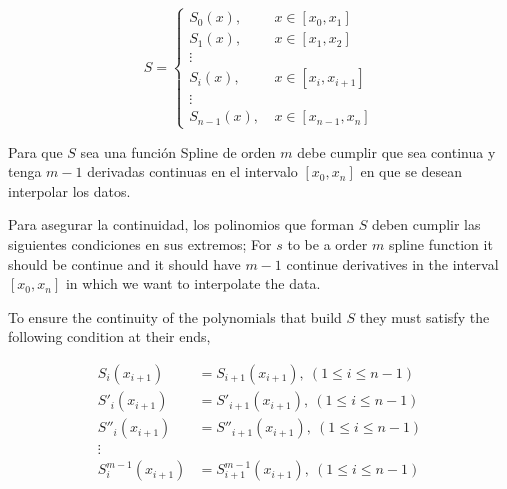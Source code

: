 \begin{equation*}
S= \left\{ 
\begin{aligned}
S_0(x),& \ x\in [x_0,x_1]\\
S_1(x),& \ x\in [x_1,x_2]\\
\vdots \\
S_i(x),& \ x\in [x_i,x_{i+1}]\\
\vdots \\
S_{n-1}(x),& \ x\in [x_{n-1},x_n]
\end{aligned}
\right.
\end{equation*}
\begin{paracol}{2}
Para que $S$ sea una función Spline de orden $m$ debe cumplir que sea continua y tenga $m-1$ derivadas continuas en el intervalo $[x_0,x_n]$ en que se desean interpolar los datos.
   
Para asegurar la continuidad, los polinomios que forman $S$ deben cumplir las siguientes condiciones en sus extremos;
\switchcolumn
For $s$ to be a order $m$ spline function it should be continue and it should have $m-1$ continue derivatives in the interval $[x_0,x_n]$ in which we want to interpolate the data.

To ensure the continuity of the polynomials that build $S$ they must satisfy the following condition at their ends, 
\end{paracol}
\begin{align*}
S_i(x_{i+1})&=S_{i+1}(x_{i+1}),\ (1\leq i \leq n-1)\\
S'_i(x_{i+1})&=S'_{i+1}(x_{i+1}),\ (1\leq i \leq n-1)\\
S''_i(x_{i+1})&=S''_{i+1}(x_{i+1}),\ (1\leq i \leq n-1)\\
\vdots \\
S^{m-1}_i(x_{i+1})&=S^{m-1}_{i+1}(x_{i+1}),\ (1\leq i \leq n-1)\\
\end{align*}
